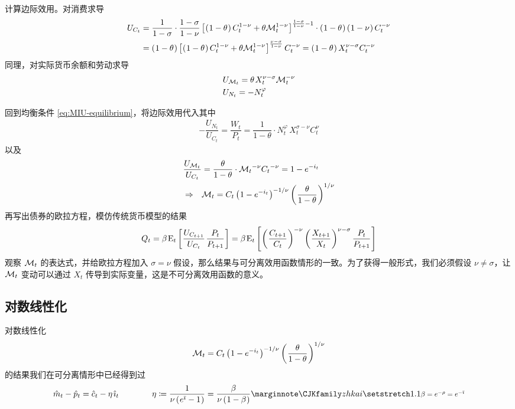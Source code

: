 计算边际效用。对消费求导
\begin{align*}
    U_{C_t}
    &=\dfrac{1}{1-\sigma}\cdot\dfrac{1-\sigma}{1-\nu}
    \bks{\bka{1-\theta}C_t^{1-\nu}+\theta\cal M_t^{1-\nu}}^{\frac{1-\sigma}{1-\nu}-1}
    \cdot\bka{1-\theta}\bka{1-\nu}C_t^{-\nu}\\
    &=\bka{1-\theta}
    \bks{\bka{1-\theta}C_t^{1-\nu}+\theta\cal M_t^{1-\nu}}^{\frac{\nu-\sigma}{1-\nu}}
    C_t^{-\nu}=\bka{1-\theta}X_t^{\nu-\sigma}C_t^{-\nu}
\end{align*}
同理，对实际货币余额和劳动求导
\begin{align*}
    &U_{\cal M_t}=\theta\,X_t^{\nu-\sigma}\cal M_t^{-\nu}\\
    &U_{N_t}=-N_t^\varphi
\end{align*}

回到均衡条件 \ref{eq:MIU-equilibrium}，将边际效用代入其中
\begin{align}
    -\dfrac{U_{N_t}}{U_{C_t}}=\dfrac{W_t}{P_t}=\dfrac1{1-\theta}\cdot N_t^\varphi\,X_t^{\sigma-\nu}C_t^\nu\label{eq:MIU-labor-equilibrium}
\end{align}
以及
\begin{align*}
    \dfrac{U_{\cal M_t}}{U_{C_t}}&=\dfrac{\theta}{1-\theta}\cdot{\cal M_t}^{-\nu}{C_t}^{-\nu}=1-e^{-i_t}\\
    \Rightarrow\quad & \cal M_t=C_t\bka{1-e^{-i_t}}^{-1/\nu}\bka{\dfrac\theta{1-\theta}}^{1/\nu}
\end{align*}
再写出债券的欧拉方程，模仿传统货币模型的结果
\begin{align*}
    Q_t=\beta\,\meant\bks{\dfrac{U_{C_{t+1}}}{U_{C_t}}\,\dfrac{P_t}{P_{t+1}}}=\beta\,\meant\bks{\bka{\dfrac{C_{t+1}}{C_t}}^{-\nu}\bka{\dfrac{X_{t+1}}{X_t}}^{\nu-\sigma}\dfrac{P_t}{P_{t+1}}}
\end{align*}
观察 \(\cal M_t\) 的表达式，并给欧拉方程加入 \(\sigma=\nu\) 假设，那么结果与可分离效用函数情形的一致。为了获得一般形式，我们必须假设 \(\nu\ne\sigma\)，让 \(\cal M_t\) 变动可以通过 \(X_t\) 传导到实际变量，这是不可分离效用函数的意义。

\subsection{对数线性化}


对数线性化
\begin{align*}
    \cal M_t=C_t\bka{1-e^{-i_t}}^{-1/\nu}\bka{\dfrac\theta{1-\theta}}^{1/\nu}
\end{align*}
的结果我们在可分离情形中已经得到过
\begin{align}
    \hat m_t-\hat p_t=\hat c_t-\eta\,\hat\imath_t\qquad\qquad\eta\coloneq\dfrac{1}{\nu\bka{e^{\bar\imath}-1}}=\dfrac{\beta}{\nu\bka{1-\beta}}\label{eq:MIU-money-equilibrium-log-linear}\sidenote{\sidemath{\(\beta=e^{-\rho}=e^{-\bar\imath}\)}}
\end{align}

